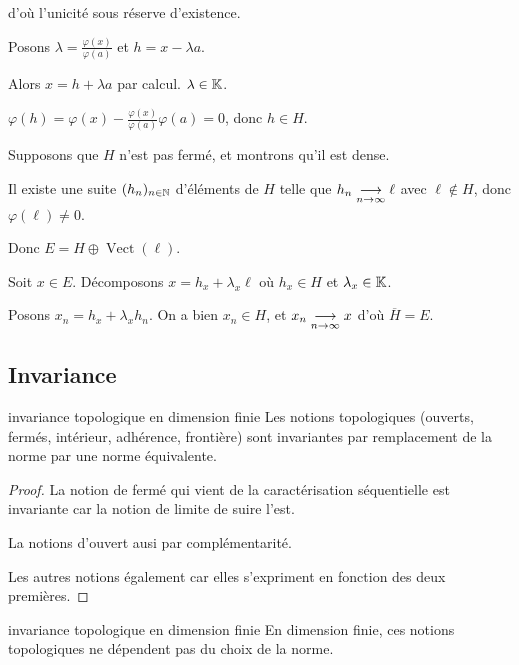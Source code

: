 \begin{exemple}
    d'où l'unicité sous réserve d'existence. 


    Posons $\lambda = \frac{\varphi(x)}{\varphi(a)}$ et $h = x - \lambda a$.

    Alors $x = h + \lambda a$ par calcul. $\lambda \in \mathbb{K}$. 

    $\varphi(h) = \varphi(x) - \frac{\varphi(x)}{\varphi(a)} \varphi(a) = 0$, donc $h \in H$.

    Supposons que $H$ n'est pas fermé, et montrons qu'il est dense.

    Il existe une suite $(h_n)_{n \in \mathbb{N}}$ d'éléments de $H$ telle que 
    $h_n \underset{n \to \infty}{\longrightarrow} \ell$ avec $\ell \not \in H$, donc $\varphi(\ell) \neq 0$.

    Donc $E = H \oplus \operatorname{Vect}(\ell)$.

    Soit $x \in E$. Décomposons $x = h_x + \lambda_x \ell$ où $h_x \in H$ et $\lambda_x \in \mathbb{K}$.

    Posons $x_n = h_x + \lambda_x h_n$. On a bien $x_n \in H$, et $x_n \underset{n \to \infty}{\longrightarrow} x$ 
    d'où $\overline H = E$.


\end{exemple}


\subsection{Invariance}

\begin{theoreme}{invariance topologique en dimension finie}{}
    Les notions topologiques (ouverts, fermés, intérieur, adhérence, frontière) sont invariantes
    par remplacement de la norme par une norme équivalente. 
\end{theoreme}

\begin{proof}
    La notion de fermé qui vient de la caractérisation séquentielle est invariante car la notion de 
    limite de suire l'est. 

    La notions d'ouvert ausi par complémentarité. 

    Les autres notions également car elles s'expriment en fonction des deux premières.
\end{proof}


\begin{corollaire}{invariance topologique en dimension finie}{}
    En dimension finie, ces notions topologiques ne dépendent pas du choix de la norme. 
\end{corollaire}




